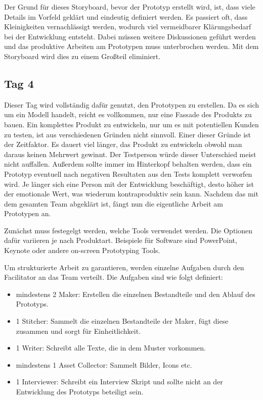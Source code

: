 Der Grund für dieses Storyboard, bevor der Prototyp erstellt wird, ist, dass viele Details im Vorfeld geklärt und eindeutig definiert werden. Es passiert oft, dass Kleinigkeiten vernachlässigt werden, wodurch viel vermeidbarer Klärungsbedarf bei der Entwicklung entsteht. Dabei müssen weitere Diskussionen geführt werden und das produktive Arbeiten am Prototypen muss unterbrochen werden. Mit dem Storyboard wird dies zu einem Großteil eliminiert.

\subsection*{\label{sec:Sprint-Tag4}\thesubsection\quad Tag 4}
Dieser Tag wird vollständig dafür genutzt, den Prototypen zu erstellen. Da es sich um ein Modell handelt, reicht es vollkommen, nur eine Fassade des Produkts zu bauen. Ein komplettes Produkt zu entwickeln, nur um es mit potentiellen Kunden zu testen, ist aus verschiedenen Gründen nicht sinnvoll. Einer dieser Gründe ist der Zeitfaktor. Es dauert viel länger, das Produkt zu entwickeln obwohl man daraus keinen Mehrwert gewinnt. Der Testperson würde dieser Unterschied meist nicht auffallen. Außerdem sollte immer im Hinterkopf behalten werden, dass ein Prototyp eventuell nach negativen Resultaten aus den Tests komplett verworfen wird. Je länger sich eine Person mit der Entwicklung beschäftigt, desto höher ist der emotionale Wert, was wiederum kontraproduktiv sein kann. Nachdem das mit dem gesamten Team abgeklärt ist, fängt nun die eigentliche Arbeit am Prototypen an.

Zunächst muss festegelgt werden, welche Tools verwendet werden. Die Optionen dafür variieren je nach Produktart. Beispiele für Software sind PowerPoint, Keynote oder andere on-screen Prototyping Tools.

Um strukturierte Arbeit zu garantieren, werden einzelne Aufgaben durch den Facilitator an das Team verteilt. Die Aufgaben sind wie folgt definiert:
\begin{itemize}
	\item mindestens 2 Maker:
	Erstellen die einzelnen Bestandteile und den Ablauf des Prototyps.
	\item 1 Stitcher:
	Sammelt die einzelnen Bestandteile der Maker, fügt diese zusammen und sorgt für Einheitlichkeit.
	\item 1 Writer:
	Schreibt alle Texte, die in dem Muster vorkommen.
	\item mindestens 1 Asset Collector:
	Sammelt Bilder, Icons etc.
	\item 1 Interviewer:
	Schreibt ein Interview Skript und sollte nicht an der Entwicklung des Prototyps beteiligt sein.
\end{itemize}

